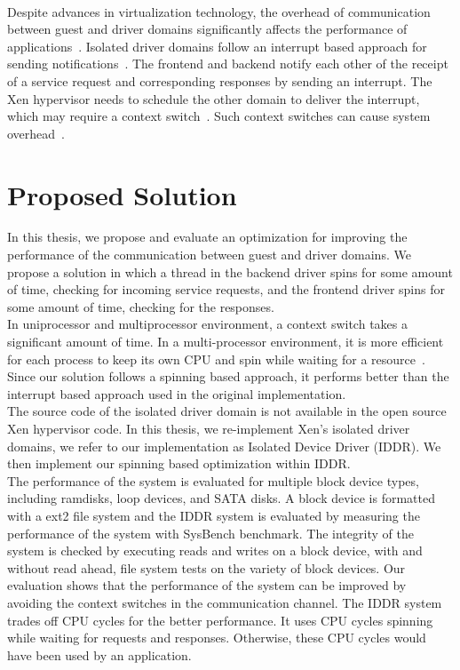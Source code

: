 \\[3mm]
Despite advances in virtualization technology, the overhead of communication between guest and driver domains significantly affects the performance of applications~\cite{barham2003xen, Sugerman:2001:VID:647055.715774, Menon:2006:ONV:1267359.1267361}. Isolated driver domains follow an interrupt based approach for sending notifications~\cite{barham2003xen}. The frontend and backend notify each other of the receipt of a service request and corresponding responses by sending an interrupt. The Xen hypervisor needs to schedule the other domain to deliver the interrupt, which may require a context switch~\cite{barham2003xen}. Such context switches can cause system overhead~\cite{Li:2007:QCC:1281700.1281702, Mogul:1991:ECS:106973.106982}.

\section {Proposed Solution}
In this thesis, we propose and evaluate an optimization for improving the performance of the communication between guest and driver domains. We propose a solution in which a thread in the backend driver spins for some amount of time, checking for incoming service requests, and the frontend driver spins for some amount of time, checking for the responses. 
\\[3mm]
In uniprocessor and multiprocessor environment, a context switch takes a significant amount of time. In a multi-processor environment, it is more efficient for each process to keep its own CPU and spin while waiting for a resource~\cite{Bovet:2005:ULK:1077084}. Since our solution follows a spinning based approach, it performs better than the interrupt based approach used in the original implementation.
\\[3mm]
The source code of the isolated driver domain is not available in the open source Xen hypervisor code. In this thesis, we re-implement Xen's isolated driver domains, we refer to our implementation as Isolated Device Driver (IDDR). We then implement our spinning based optimization within IDDR.
\\[3mm]
The performance of the system is evaluated for multiple block device types, including ramdisks, loop devices, and SATA disks. A block device is formatted with a ext2 file system and the IDDR system is evaluated by measuring the performance of the system with SysBench benchmark. The integrity of the system is checked by executing reads and writes on a block device, with and without read ahead, file system tests on the variety of block devices. Our evaluation shows that the performance of the system can be improved by avoiding the context switches in the communication channel. The IDDR system trades off CPU cycles for the better performance. It uses CPU cycles spinning while waiting for requests and responses. Otherwise, these CPU cycles would have been used by an application.

